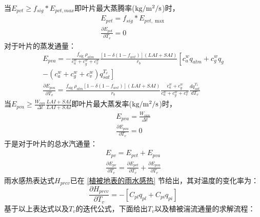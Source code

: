 当$ E_{pvt} \geq f_{sig}\ast E_{pvt,max} $即叶片最大蒸腾率($\rm kg/m^2/s$)时，
\begin{equation}
\begin{array}{c}E_{pvt}=f_{sig} * E_{pvt, \max } \\ \frac{\partial E_{pvt}}{\partial T_{v}}=0\end{array}
\end{equation}
对于叶片的蒸发通量：
\begin{equation}
\begin{array}{c}E_{pva}=-\frac{f_{\text {sig }} \rho_{atm}}{c_{a}^{w}+c_{g}^{w}+c_{v}^{w}} \frac{\left[1-\delta\left(1-f_{w e t}\right)\right](LAI+SAI)}{r_{b}}\left[c_{a}^{w} q_{atm}+c_{g}^{w} q_{g}\right. \\ \left.-\left(c_{a}^{w}+c_{g}^{w}+c_{v}^{w}\right) q_{s a t}^{T_{v}}\right] \\ \frac{\partial E_{pva}}{\partial T_{v}}=\frac{f_{\text {sig }} \rho_{atm}\left[1-\delta\left(1-f_{w e t}\right)\right](LAI+SAI)}{r_{b}} \frac{c_{a}^{w}+c_{g}^{w}}{c_{a}^{w}+c_{g}^{w}+c_{v}^{w}} \frac{d q_{s a t}^{T_{v}}}{d T_{v}}\end{array}
\end{equation}
当$E_{pva} \geq \frac{W_{can}}{\Delta t} \frac{LAI+SAI}{LAI+SAI}$即叶片最大蒸发率($\rm kg/m^2/s$)时，
\begin{equation}
\begin{array}{c}E_{pva}=\frac{W_{can}}{\Delta t} \\ \frac{\partial E_{pva}}{\partial T_{v}}=0\end{array}
\end{equation}
于是对于叶片的总水汽通量：
\begin{equation}
\begin{array}{l}E_{pv}=E_{pvt}+E_{pva} \\ 
    \frac{\partial E_{pv}}{\partial T_{v}}=\frac{\partial E_{pvt}}{\partial T_{v}}+\frac{\partial E_{pva}}{\partial T_{v}}\end{array}
\end{equation}
雨水感热表达式$H_{prcv}$已在 \ref{植被地表的雨水感热} 节给出，其对温度的变化率为：
\begin{equation}
\frac{\partial H_{prcv}}{\partial T_{v}}=-\left[C_{p l} q_{p l}+C_{p i} q_{p i}\right]
\end{equation}
基于以上表达式以及$T_v$的迭代公式，下面给出$T_v$以及植被湍流通量的求解流程：

